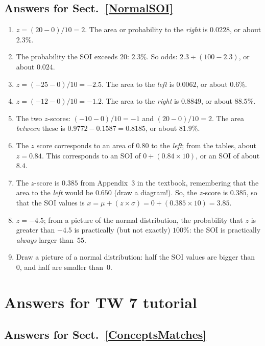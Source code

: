 \documentclass[
  11pt,
  a4paper,
  krantz2]{krantz}
\providecommand{\tightlist}{%
  \setlength{\itemsep}{0pt}\setlength{\parskip}{0pt}}
\begin{document}
\begin{footnotesize}
\subsection*{Answers for Sect.~\ref{NormalSOI}}\label{answers-for-sect.-refnormalsoi}

\begin{enumerate}
\def\labelenumi{\arabic{enumi}.}
\setcounter{enumi}{1}
\tightlist
\item
  \(z = (20 - 0)/10 = 2\).
  The area or probability to the \emph{right} is \(0.0228\), or about \(2.3\)\%.
\item
  The probability the SOI exceeds \(20\): \(2.3\)\%.
  So odds: \(2.3\div(100 - 2.3)\), or about \(0.024\).
\item
  \(z = (-25 - 0)/10 = -2.5\).
  The area to the \emph{left} is \(0.0062\), or about \(0.6\)\%.
\item
  \(z = (-12 - 0)/10 = -1.2\).
  The area to the \emph{right} is \(0.8849\), or about \(88.5\)\%.
\item
  The two \(z\)-scores: \((-10 - 0)/10 = -1\) and \((20 - 0)/10 = 2\).
  The area \emph{between} these is \(0.9772 - 0.1587 = 0.8185\), or about \(81.9\)\%.
\item
  The \(z\) score corresponds to an area of \(0.80\) to the \emph{left}; from the tables, about \(z = 0.84\).
  This corresponds to an SOI of \(0 + (0.84\times 10)\), or an SOI of about \(8.4\).
\item
  The \(z\)-score is \(0.385\) from Appendix~3 in the textbook, remembering that the area to the \emph{left} would be \(0.650\) (draw a diagram!).
  So, the \(z\)-score is \(0.385\), so that the SOI values is \(x = \mu + (z\times\sigma) = 0 + (0.385\times 10) = 3.85\).
\item
  \(z = -4.5\); from a picture of the normal distribution, the probability that \(z\) is greater than \(-4.5\) is practically (but not exactly) \(100\)\%: the SOI is practically \emph{always} larger than~\(55\).
\item
  Draw a picture of a normal distribution: half the SOI values are bigger than~\(0\), and half are smaller than~\(0\).
\end{enumerate}

\section{Answers for TW 7 tutorial}\label{Lecture7Answers}

\subsection*{Answers for Sect.~\ref{ConceptsMatches}}\label{answers-for-sect.-refconceptsmatches}


\end{footnotesize}
\end{document}
